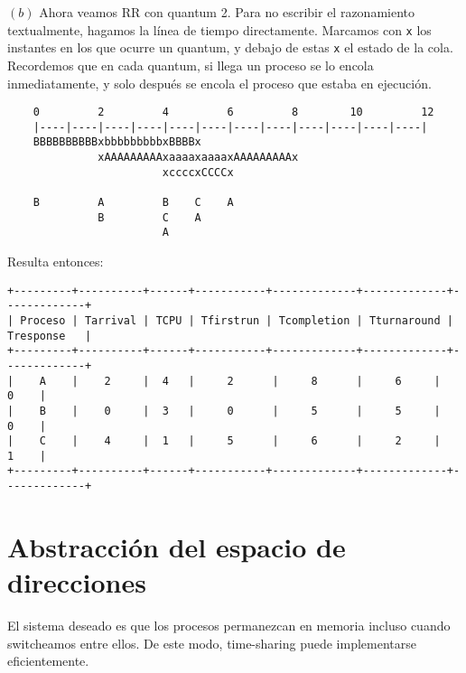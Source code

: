 \documentclass[12pt]{article}
\theoremstyle{definition}
\begin{document}
\pagebreak

$(b)$ Ahora veamos RR con quantum 2. Para no escribir el razonamiento
textualmente, hagamos la línea de tiempo directamente. Marcamos con \texttt{x}
los instantes en los que ocurre un quantum, y debajo de estas \texttt{x} el
estado de la cola. Recordemos que en cada quantum, si llega un proceso se lo
encola inmediatamente, y solo después se encola el proceso que estaba en
ejecución.

\begin{verbatim}
    0         2         4         6         8        10         12
    |----|----|----|----|----|----|----|----|----|----|----|----|
    BBBBBBBBBBxbbbbbbbbbxBBBBx
              xAAAAAAAAAxaaaaxaaaaxAAAAAAAAAx
                        xccccxCCCCx

    B         A         B    C    A
              B         C    A
                        A
\end{verbatim}

Resulta entonces:
\footnotesize
\begin{verbatim}
+---------+----------+------+-----------+-------------+-------------+-------------+
| Proceso | Tarrival | TCPU | Tfirstrun | Tcompletion | Tturnaround | Tresponse   |
+---------+----------+------+-----------+-------------+-------------+-------------+
|    A    |    2     |  4   |     2      |     8      |     6     |     0    |
|    B    |    0     |  3   |     0      |     5      |     5     |     0    |
|    C    |    4     |  1   |     5      |     6      |     2     |     1    |
+---------+----------+------+-----------+-------------+-------------+-------------+
\end{verbatim}
\normalsize



















\pagebreak



\section{Abstracción del espacio de direcciones}

El sistema deseado es que los procesos permanezcan en memoria incluso cuando
switcheamos entre ellos. De este modo, time-sharing puede implementarse
eficientemente. 
\end{document}
